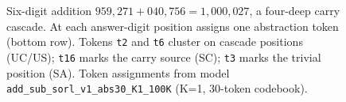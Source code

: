 \begin{figure}[t]
\begin{tikzpicture}
\end{tikzpicture}
\caption{%
  Six-digit addition $959{,}271 + 040{,}756 = 1{,}000{,}027$, a four-deep
  carry cascade. At each answer-digit position \sorl{} assigns one
  abstraction token (bottom row). Tokens \texttt{t2} and \texttt{t6}
  cluster on cascade positions (UC/US); \texttt{t16} marks the carry
  source (SC); \texttt{t3} marks the trivial position (SA).
  Token assignments from model \texttt{add\_sub\_sorl\_v1\_abs30\_K1\_100K}
  (K=1, 30-token codebook).%
}
\label{fig:arithmetic-example}
\end{figure}
